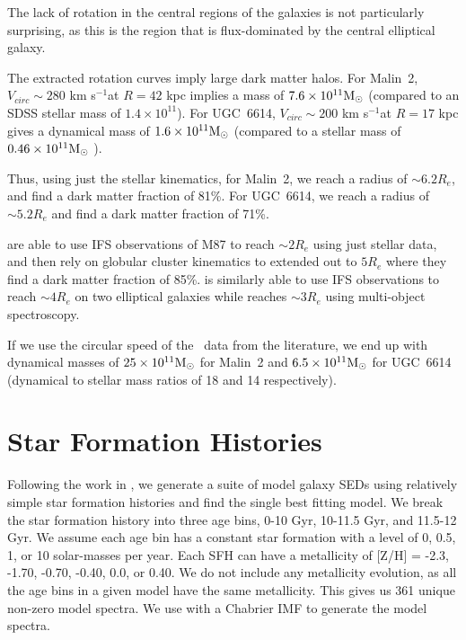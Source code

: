 \documentclass[12pt,preprint]{aastex}
\newcommand\msun{\rm{M}_\odot}
\newcommand\kms{km s$^{-1}$}
\newcommand\HI{\ion{H}{1}}
\begin{document}
The lack of rotation in the central regions of the galaxies is not particularly surprising, as this is the region that is flux-dominated by the central elliptical galaxy.


The extracted rotation curves imply large dark matter halos.
For Malin~2, $V_{circ}\sim 280$ \kms at $R=42$ kpc implies a mass of $7.6\times 10^{11} \msun$ (compared to an SDSS stellar mass of $1.4\times 10^{11}$).
For UGC~6614, $V_{circ}\sim 200$ \kms at $R=17$ kpc gives a dynamical mass of $1.6\times 10^{11} \msun$ (compared to a stellar mass of $0.46\times 10^{11} \msun$ ).


Thus, using just the stellar kinematics, for Malin~2, we reach a radius of $\sim 6.2 R_e$, and find a dark matter fraction of 81\%.
For UGC~6614, we reach a radius of  $\sim 5.2 R_e$ and find a dark matter fraction of 71\%.


\citet{Murphy2011} are able to use IFS observations of M87 to reach $\sim2 R_e$ using just stellar data, and then rely on globular cluster kinematics to extended out to $5 R_e$ where they find a dark matter fraction of 85\%.
\citet{Weij09} is similarly able to use IFS observations to reach $\sim 4 R_e$ on two elliptical galaxies while \citet{Proctor09} reaches $\sim 3 R_e$ using multi-object spectroscopy.



If we use the circular speed of the \HI\ data from the literature, we end up with dynamical masses of $25\times 10^{11} \msun$ for Malin~2 and $6.5\times 10^{11} \msun$ for UGC~6614 (dynamical to stellar mass ratios of 18 and 14 respectively).



\section{Star Formation Histories}\label{sec:sfh}

Following the work in \citet{Yoachim10,Yoachim12}, we generate a suite of model galaxy SEDs using relatively simple star formation histories and find the single best fitting model.
We break the star formation history into three age bins, 0-10 Gyr, 10-11.5 Gyr, and 11.5-12 Gyr.
We assume each age bin has a constant star formation with a level of 0, 0.5, 1, or 10 solar-masses per year.
Each SFH can have a metallicity of [Z/H] = -2.3, -1.70, -0.70, -0.40, 0.0, or 0.40.
We do not include any metallicity evolution, as all the age bins in a given model have the same metallicity.
This gives us 361 unique non-zero model spectra. We use \citet{Bruzual03} with a Chabrier IMF to generate the model spectra. 
  
\end{document}
